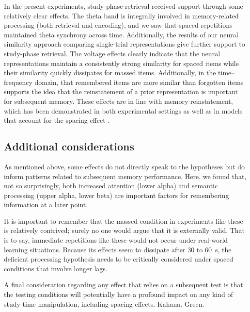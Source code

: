 In the present experiments, study-phase retrieval received support through some relatively clear effects.  The theta band is integrally involved in memory-related processing (both retrieval and encoding), and we saw that spaced repetitions maintained theta synchrony across time.  Additionally, the results of our neural similarity approach comparing single-trial representations give further support to study-phase retrieval.  The voltage effects clearly indicate that the neural representations
maintain a consistently strong similarity for spaced items while their similarity quickly dissipates for massed items.  Additionally, in the time--frequency domain, that remembered items are more similar than forgotten items supports the idea that the reinstatement of a prior representation is important for subsequent memory.
These effects are in line with memory reinstatement, which has been demonstrated in both experimental settings \cite{MannEtal2011} as well as in models that account for the spacing effect \cite{LohnKaha2014b}.

\subsection{Additional considerations}

As mentioned above, some effects do not directly speak to the hypotheses but do inform patterns related to subsequent memory performance.  Here, we found that, not so surprisingly, both increased attention (lower alpha) and semantic processing (upper alpha, lower beta) are important factors for remembering information at a later point.

It is important to remember that the massed condition in experiments like these is relatively contrived; surely no one would argue that it is externally valid.  That is to say, immediate repetitions like these would not occur under real-world learning situations.  Because its effects seem to dissipate after 30 to 60~s, the deficient processing hypothesis needs to be critically considered under spaced conditions that involve longer lags.

A final consideration regarding any effect that relies on a subsequent test is that the testing conditions will potentially have a profound impact on any kind of study-time manipulation, including spacing effects. Kahana. Green.


